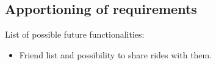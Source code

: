 \subsection{Apportioning of requirements}

List of possible future functionalities:
\begin{itemize}
\item Friend list and possibility to share rides with them.
\end{itemize}
